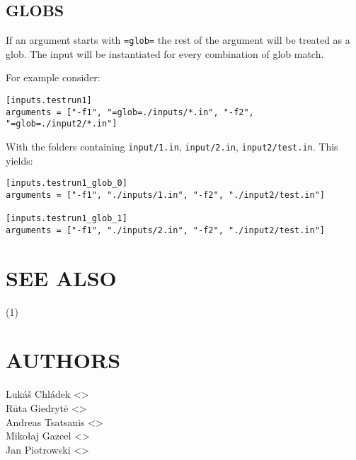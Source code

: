 \documentclass[a4paper,english]{article}
\begin{document}
      \subsection{GLOBS}

      If an argument starts with \texttt{=glob=} the rest of the argument will be treated as a glob.
      The input will be instantiated for every combination of glob match.

      \noindent For example consider:

      \begin{verbatim}
[inputs.testrun1]
arguments = ["-f1", "=glob=./inputs/*.in", "-f2", "=glob=./input2/*.in"]
      \end{verbatim}

      \noindent With the folders containing \texttt{input/1.in}, \texttt{input/2.in}, \texttt{input2/test.in}. This yields:

      \begin{verbatim}
[inputs.testrun1_glob_0]
arguments = ["-f1", "./inputs/1.in", "-f2", "./input2/test.in"]

[inputs.testrun1_glob_1]
arguments = ["-f1", "./inputs/2.in", "-f2", "./input2/test.in"]
      \end{verbatim}


  \section{SEE ALSO}
      (1)

  \section{AUTHORS}
    Lukáš Chládek <>\\[0.1cm]\MANbr
    Rūta Giedrytė <>\\[0.1cm]\MANbr
    Andreas Tsatsanis <>\\[0.1cm]\MANbr
    Mikołaj Gazeel <>\\[0.1cm]\MANbr
    Jan Piotrowski <>

\end{document}
